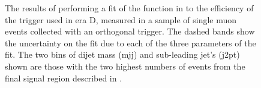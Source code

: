 \begin{figure}
  \caption{The results of performing a fit of the function in  to the efficiency of the trigger used in era D, measured in a sample of single muon events collected with an orthogonal trigger. The dashed bands show the uncertainty on the fit due to each of the three parameters of the fit. The two bins of dijet mass (mjj) and sub-leading jet's \pt (j2pt) shown are those with the two highest numbers of events from the final signal region described in .}
  \label{fig:parkedtrigeff}
\end{figure}

